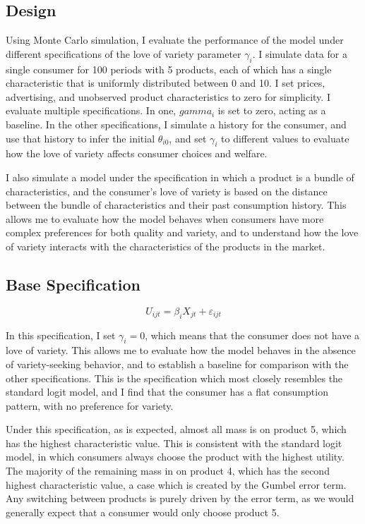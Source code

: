 \documentclass[12pt]{article}
\begin{document}
    \subsection{Design}

    Using Monte Carlo simulation, I evaluate the performance of the model under different specifications of the love of variety parameter $\gamma_i$. I simulate data for a single consumer for 100 periods with 5 products, each of which has a single characteristic that is uniformly distributed between 0 and 10. I set prices, advertising, and unobserved product characteristics to zero for simplicity. I evaluate multiple specifications. In one, $gamma_i$ is set to zero, acting as a baseline. In the other specifications, I simulate a history for the consumer, and use that history to infer the initial $\theta_{i0}$, and set $\gamma_i$ to different values to evaluate how the love of variety affects consumer choices and welfare.

    I also simulate a model under the specification in which a product is a bundle of characteristics, and the consumer's love of variety is based on the distance between the bundle of characteristics and their past consumption history. This allows me to evaluate how the model behaves when consumers have more complex preferences for both quality and variety, and to understand how the love of variety interacts with the characteristics of the products in the market.

    \subsection{Base Specification}

    \begin{equation}
      U_{ijt} = \beta_{i} X_{jt} + \varepsilon_{ijt}
    \end{equation}

    In this specification, I set $\gamma_i = 0$, which means that the consumer does not have a love of variety. This allows me to evaluate how the model behaves in the absence of variety-seeking behavior, and to establish a baseline for comparison with the other specifications. This is the specification which most closely resembles the standard logit model, and I find that the consumer has a flat consumption pattern, with no preference for variety.

    Under this specification, as is expected, almost all mass is on product 5, which has the highest characteristic value. This is consistent with the standard logit model, in which consumers always choose the product with the highest utility. The majority of the remaining mass in on product 4, which has the second highest characteristic value, a case which is created by the Gumbel error term. Any switching between products is purely driven by the error term, as we would generally expect that a consumer would only choose product 5.
\end{document}
